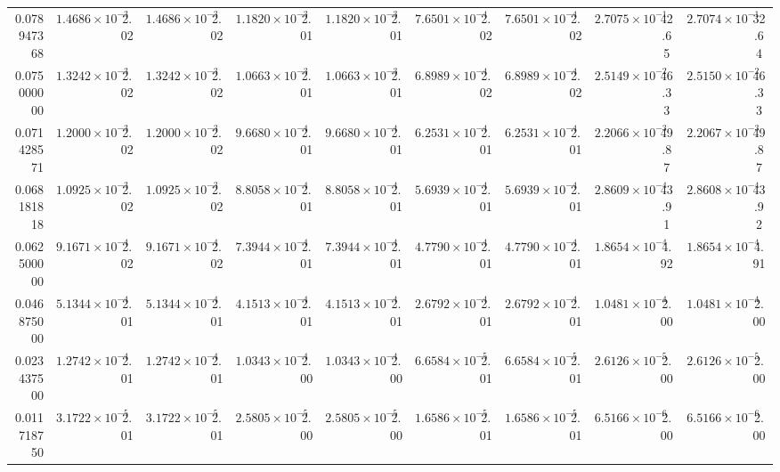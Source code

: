 \begin{table}
{\begin{tabular}{r cc cc cc cc cc cc cc cc }
0.078947368 & $1.4686\times10^{-3}$ & 2.02 & $1.4686\times10^{-3}$ & 2.02 & $1.1820\times10^{-3}$ & 2.01 & $1.1820\times10^{-3}$ & 2.01 & $7.6501\times10^{-4}$ & 2.02 & $7.6501\times10^{-4}$ & 2.02 & $2.7075\times10^{-1}$ & 42.65 & $2.7074\times10^{-1}$ & 32.64 \\
0.075000000 & $1.3242\times10^{-3}$ & 2.02 & $1.3242\times10^{-3}$ & 2.02 & $1.0663\times10^{-3}$ & 2.01 & $1.0663\times10^{-3}$ & 2.01 & $6.8989\times10^{-4}$ & 2.02 & $6.8989\times10^{-4}$ & 2.02 & $2.5149\times10^{-2}$ & 46.33 & $2.5150\times10^{-2}$ & 46.33 \\
0.071428571 & $1.2000\times10^{-3}$ & 2.02 & $1.2000\times10^{-3}$ & 2.02 & $9.6680\times10^{-4}$ & 2.01 & $9.6680\times10^{-4}$ & 2.01 & $6.2531\times10^{-4}$ & 2.01 & $6.2531\times10^{-4}$ & 2.01 & $2.2066\times10^{-3}$ & 49.87 & $2.2067\times10^{-3}$ & 49.87 \\
0.068181818 & $1.0925\times10^{-3}$ & 2.02 & $1.0925\times10^{-3}$ & 2.02 & $8.8058\times10^{-4}$ & 2.01 & $8.8058\times10^{-4}$ & 2.01 & $5.6939\times10^{-4}$ & 2.01 & $5.6939\times10^{-4}$ & 2.01 & $2.8609\times10^{-4}$ & 43.91 & $2.8608\times10^{-4}$ & 43.92 \\
0.062500000 & $9.1671\times10^{-4}$ & 2.02 & $9.1671\times10^{-4}$ & 2.02 & $7.3944\times10^{-4}$ & 2.01 & $7.3944\times10^{-4}$ & 2.01 & $4.7790\times10^{-4}$ & 2.01 & $4.7790\times10^{-4}$ & 2.01 & $1.8654\times10^{-4}$ & 4.92 & $1.8654\times10^{-4}$ & 4.91 \\
0.046875000 & $5.1344\times10^{-4}$ & 2.01 & $5.1344\times10^{-4}$ & 2.01 & $4.1513\times10^{-4}$ & 2.01 & $4.1513\times10^{-4}$ & 2.01 & $2.6792\times10^{-4}$ & 2.01 & $2.6792\times10^{-4}$ & 2.01 & $1.0481\times10^{-4}$ & 2.00 & $1.0481\times10^{-4}$ & 2.00 \\
0.023437500 & $1.2742\times10^{-4}$ & 2.01 & $1.2742\times10^{-4}$ & 2.01 & $1.0343\times10^{-4}$ & 2.00 & $1.0343\times10^{-4}$ & 2.00 & $6.6584\times10^{-5}$ & 2.01 & $6.6584\times10^{-5}$ & 2.01 & $2.6126\times10^{-5}$ & 2.00 & $2.6126\times10^{-5}$ & 2.00 \\
0.011718750 & $3.1722\times10^{-5}$ & 2.01 & $3.1722\times10^{-5}$ & 2.01 & $2.5805\times10^{-5}$ & 2.00 & $2.5805\times10^{-5}$ & 2.00 & $1.6586\times10^{-5}$ & 2.01 & $1.6586\times10^{-5}$ & 2.01 & $6.5166\times10^{-6}$ & 2.00 & $6.5166\times10^{-6}$ & 2.00 \\
\bottomrule
\end{tabular}}
\end{table}
